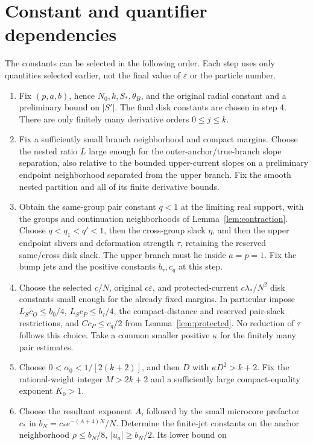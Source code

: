 \documentclass[11pt]{article}
\numberwithin{equation}{section}
\theoremstyle{definition}
\newcommand{\eps}{\varepsilon}
\begin{document}
\section{Constant and quantifier dependencies}\label{app:constants}
The constants can be selected in the following order. Each step
uses only quantities selected earlier, not the final value of
\(\eps\) or the particle number.
\begin{enumerate}
\item Fix \((p,a,b)\), hence \(N_0,k,S_*,\theta_B\), and the
original radial constant and a preliminary bound on \(|S'|\).
The final disk constants are chosen in step 4. There are only finitely many
derivative orders \(0\le j\le k\).
\item Fix a sufficiently small branch neighborhood and compact
margins. Choose the nested ratio \(L\) large enough for the
outer-anchor/true-branch slope separation, also relative to the
bounded upper-current slopes on a preliminary endpoint neighborhood
separated from the upper branch. Fix the smooth nested
partition and all of its finite derivative bounds.
\item Obtain the same-group pair constant \(q<1\) at the limiting
real support, with the groups and continuation neighborhoods of
Lemma~\ref{lem:contraction}. Choose \(q<q_1<q'<1\), then the cross-group slack
\(\eta\), and then the upper endpoint slivers and deformation
strength \(\tau\), retaining the reserved same/cross disk slack.
The upper branch must lie inside \(a=p=1\). Fix the bump jets
and the positive constants \(b_\tau,c_q\) at this step.
\item Choose the selected \(c/N\), original \(c\eps\), and
protected-current \(c\lambda_*/N^2\) disk constants small enough
for the already fixed margins. In particular impose
\(L_Sc_O\le b_0/4\), \(L_Sc_P\le b_\tau/4\), the
compact-distance and reserved pair-slack restrictions, and
\(Cc_P\le c_q/2\) from Lemma~\ref{lem:protected}.
No reduction of \(\tau\) follows this choice. Take a common smaller positive
\(\kappa\) for the finitely many pair estimates.
\item Choose \(0<\alpha_0<1/[2(k+2)]\), and then \(D\) with
\(\kappa D^2>k+2\). Fix the rational-weight integer \(M>2k+2\)
and a sufficiently large compact-equality exponent \(K_0>1\).
\item Choose the resultant exponent \(A\), followed by the small
microcore prefactor \(c_*\) in \(b_N=c_*e^{-(A+4)N}/N\).
Determine the finite-jet constants on the anchor neighborhood
\(\rho\le b_N/8\), \(|u_a|\ge b_N/2\). Its lower bound on

\end{enumerate}
\end{document}
